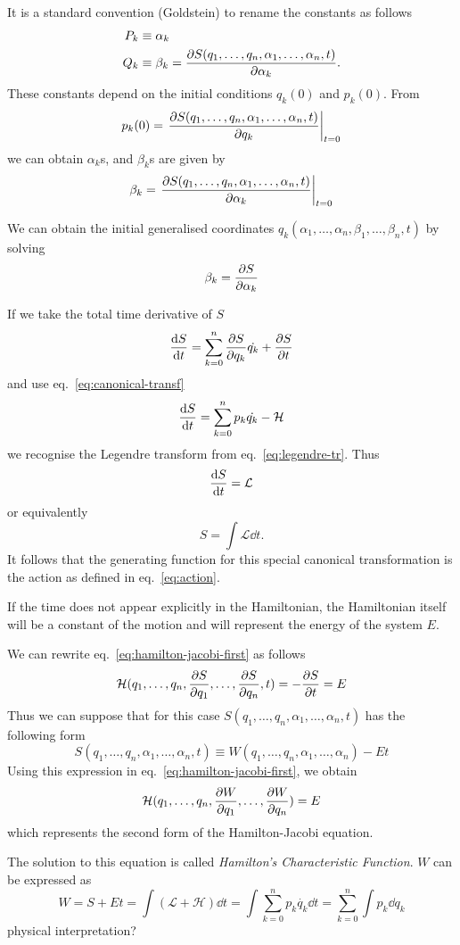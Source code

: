 \documentclass[../thesis.tex]{subfiles}
\theoremstyle{plain}
\begin{document}
It is a standard convention (Goldstein) to rename the constants as follows
\begin{align*}
  P_k &\equiv \alpha_k \\
  Q_k &\equiv \beta_k = \pdv{S(q_1,\dotsc,q_n,\alpha_1,\dotsc,\alpha_n,t)}{\alpha_k}.
\end{align*}
These constants depend on the initial conditions \(q_k(0)\) and \(p_k(0)\). From
\[
  p_k(0) = \eval{\pdv{S(q_1,\dotsc,q_n,\alpha_1,\dotsc,\alpha_n,t)}{q_k}}_{t=0}
\]
we can obtain \(\alpha_k\)s, and \(\beta_k\)s are given by
\[
  \beta_k = \eval{\pdv{S(q_1,\dotsc,q_n,\alpha_1,\dotsc,\alpha_n,t)}{\alpha_k}}_{t=0}
\]

We can obtain the initial generalised coordinates
\(q_k(\alpha_1,\dotsc,\alpha_n,\beta_1,\dotsc,\beta_n,t)\) by solving
\[
  \beta_k=\pdv{S}{\alpha_k}
\]

If we take the total time derivative of \(S\)
\[
  \dv{S}{t} = \sum_{k=0}^{n} \pdv{S}{q_k} \dot{q_k} + \pdv{S}{t}
\]
and use eq.~\eqref{eq:canonical-transf}
\[
  \dv{S}{t} = \sum_{k=0}^{n} p_k \dot{q_k} - \mathcal{H}
\]
we recognise the Legendre transform from eq.~\eqref{eq:legendre-tr}. Thus
\[
  \dv{S}{t} = \mathcal{L}
\]
or equivalently
\[
  S = \int \mathcal{L} \dd{t}.
\]
It follows that the generating function for this special canonical transformation
is the action as defined in eq.~\eqref{eq:action}.

If the time does not appear explicitly in the Hamiltonian, the Hamiltonian itself
will be a constant of the motion and will represent the energy of the system \(E\).

We can rewrite eq.~\eqref{eq:hamilton-jacobi-first} as follows
\[
  \mathcal{H}(q_1,\dotsc,q_n,\pdv{S}{q_1},\dotsc,\pdv{S}{q_n},t) = - \pdv{S}{t} = E
\]
Thus we can suppose that for this case \(S(q_1,\dotsc,q_n,\alpha_1,\dotsc,\alpha_n,t)\)
has the following form
\[
  S(q_1,\dotsc,q_n,\alpha_1,\dotsc,\alpha_n,t) \equiv W(q_1,\dotsc,q_n,\alpha_1,\dotsc,\alpha_n) - Et
\]
Using this expression in eq.~\eqref{eq:hamilton-jacobi-first}, we obtain
\begin{equation}
  \label{eq:hamilton-jacobi-second}
  \mathcal{H}(q_1,\dotsc,q_n,\pdv{W}{q_1},\dotsc,\pdv{W}{q_n}) = E
\end{equation}
which represents the second form of the Hamilton-Jacobi equation.

The solution to this equation is called \emph{Hamilton's Characteristic Function}.
\(W\) can be expressed as
\[
  W = S + Et = \int \left(\mathcal{L} + \mathcal{H} \right) \dd{t}
    = \int \sum_{k=0}^n p_k \dot{q_k} \dd{t}
    = \sum_{k=0}^n \int p_k \dd{q_k}
\]
{\color{red}physical interpretation?}
\end{document}
